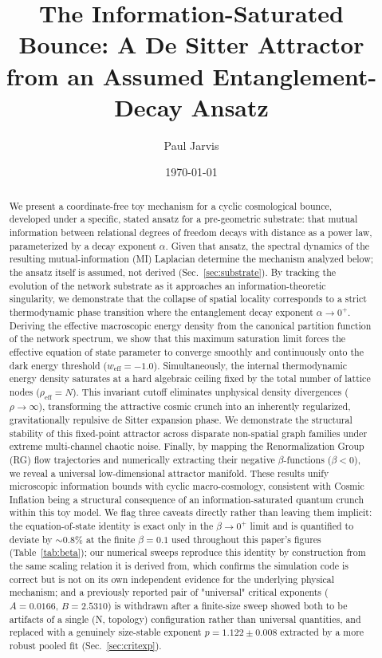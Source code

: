 \documentclass[onecolumn,PRD,amsmath,amssymb,aps,nofootinbib,superscriptaddress,11pt]{revtex4-2}
\begin{document}
\title{The Information-Saturated Bounce: A De Sitter Attractor from an Assumed Entanglement-Decay Ansatz}

\author{Paul Jarvis}

\date{\today}

\begin{abstract}
We present a coordinate-free toy mechanism for a cyclic cosmological bounce, developed under a specific, stated ansatz for a pre-geometric substrate: that mutual information between relational degrees of freedom decays with distance as a power law, parameterized by a decay exponent $\alpha$. Given that ansatz, the spectral dynamics of the resulting mutual-information (MI) Laplacian determine the mechanism analyzed below; the ansatz itself is assumed, not derived (Sec.~\ref{sec:substrate}). By tracking the evolution of the network substrate as it approaches an information-theoretic singularity, we demonstrate that the collapse of spatial locality corresponds to a strict thermodynamic phase transition where the entanglement decay exponent $\alpha \to 0^+$. Deriving the effective macroscopic energy density from the canonical partition function of the network spectrum, we show that this maximum saturation limit forces the effective equation of state parameter to converge smoothly and continuously onto the dark energy threshold ($w_{\text{eff}} = -1.0$). Simultaneously, the internal thermodynamic energy density saturates at a hard algebraic ceiling fixed by the total number of lattice nodes ($\rho_{\text{eff}} = N$). This invariant cutoff eliminates unphysical density divergences ($\rho \to \infty$), transforming the attractive cosmic crunch into an inherently regularized, gravitationally repulsive de Sitter expansion phase. We demonstrate the structural stability of this fixed-point attractor across disparate non-spatial graph families under extreme multi-channel chaotic noise. Finally, by mapping the Renormalization Group (RG) flow trajectories and numerically extracting their negative $\beta$-functions ($\beta < 0$), we reveal a universal low-dimensional attractor manifold. These results unify microscopic information bounds with cyclic macro-cosmology, consistent with Cosmic Inflation being a structural consequence of an information-saturated quantum crunch within this toy model. We flag three caveats directly rather than leaving them implicit: the equation-of-state identity is exact only in the $\beta\to0^+$ limit and is quantified to deviate by $\sim0.8\%$ at the finite $\beta=0.1$ used throughout this paper's figures (Table~\ref{tab:beta}); our numerical sweeps reproduce this identity by construction from the same scaling relation it is derived from, which confirms the simulation code is correct but is not on its own independent evidence for the underlying physical mechanism; and a previously reported pair of "universal" critical exponents ($A=0.0166$, $B=2.5310$) is withdrawn after a finite-size sweep showed both to be artifacts of a single (N, topology) configuration rather than universal quantities, and replaced with a genuinely size-stable exponent $p=1.122\pm0.008$ extracted by a more robust pooled fit (Sec.~\ref{sec:critexp}).
\end{abstract}
\end{document}
